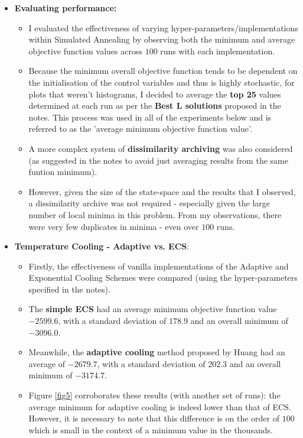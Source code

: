 \documentclass[12pt]{article}
\begin{document}
\begin{enumerate}
\begin{enumerate}
\begin{itemize}
		\item \textbf{Evaluating performance:}
		\begin{itemize}
			\item I evaluated the effectiveness of varying hyper-parameters/implementations within Simulated Annealing by observing both the minimum and average objective function values across $100$ runs with each implementation.
			\item Because the minimum overall objective function tends to be dependent on the initialisation of the control variables and thus is highly stochastic, for plots that weren't histograms, I decided to average the \textbf{top 25} values determined at each run as per the \textbf{Best L solutions} proposed in the notes. This process was used in all of the experiments below and is referred to as the 'average minimum objective function value'.
			\item A more complex system of \textbf{dissimilarity archiving} was also considered (as suggested in the notes to avoid just averaging results from the same funtion minimum).
			\item However, given the size of the state-space and the results that I observed, a dissimilarity archive was not required - especially given the large number of local minima in this problem. From my observations, there were very few duplicates in minima - even over $100$ runs.
		\end{itemize}
		\pagebreak
		\item \textbf{Temperature Cooling - Adaptive vs. ECS}:
		\begin{itemize}
		\item Firstly, the effectiveness of vanilla implementations of the Adaptive and Exponential Cooling Schemes were compared (using the hyper-parameters specified in the notes).
		\item The \textbf{simple ECS} had an average minimum objective function value $-2599.6$, with a standard deviation of $178.9$ and an overall minimum of $-3096.0$.
		\item Meanwhile, the \textbf{adaptive cooling} method proposed by Huang had an average of $-2679.7$, with a standard deviation of $202.3$ and an overall minimum of $-3174.7$.
		\item Figure \ref{fig5} corroborates these results (with another set of runs): the average minimum for adaptive cooling is indeed lower than that of ECS. However, it is necessary to note that this difference is on the order of $100$ which is small in the context of a minimum value in the thousands.

\end{itemize}
\end{itemize}
\end{enumerate}
\end{enumerate}
\end{document}
